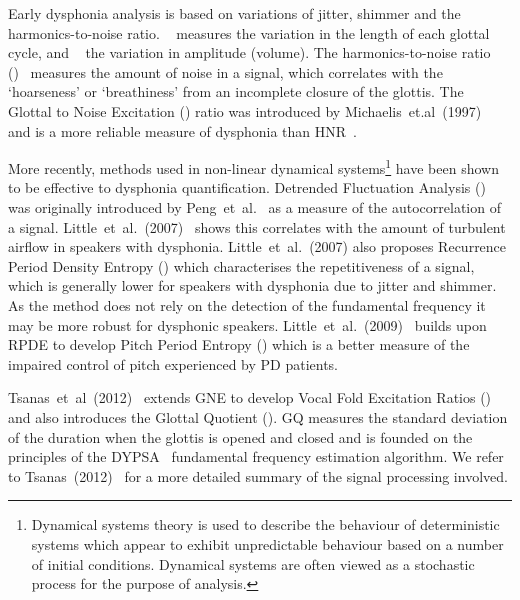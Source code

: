 \documentclass[12pt, twoside]{book}
\renewcommand\emph[1]{\textit{\color{USred}{#1}}}
\begin{document}
Early dysphonia analysis is based on variations of jitter, shimmer and the harmonics-to-noise ratio. \emph{Jitter}~ measures the variation in the length of each glottal cycle, and \emph{shimmer}~\cite{shimmerjitter,jittertime} the variation in amplitude (volume). The harmonics-to-noise ratio (\emph{HNR})~\cite{HNRintro} measures the amount of noise in a signal, which correlates with the `hoarseness' or `breathiness' from an incomplete closure of the glottis.  The Glottal to Noise Excitation (\emph{GNE}) ratio was introduced by Michaelis~et.al~(1997)~\cite{gne} and is a more reliable measure of dysphonia than HNR~\cite{gneratio}. 

\label{dfadescription}
More recently, methods used in non-linear dynamical systems\footnote{Dynamical systems theory is used to describe the behaviour of deterministic systems which appear to exhibit unpredictable behaviour based on a number of initial conditions. Dynamical systems are often viewed as a stochastic process for the purpose of analysis.} have been shown to be effective to dysphonia quantification. Detrended Fluctuation Analysis (\emph{DFA}) was originally introduced by Peng~et~al.~\cite{dfa} as a measure of the autocorrelation of a signal. Little~et~al.~(2007)~\cite{splittlenonlinear2007} shows this correlates with the amount of turbulent airflow in speakers with dysphonia. Little~et~al.~(2007) also proposes Recurrence Period Density Entropy (\emph{RPDE}) which characterises the repetitiveness of a signal, which is generally lower for speakers with dysphonia due to jitter and shimmer. As the method does not rely on the detection of the fundamental frequency it may be more robust for dysphonic speakers. Little~et~al.~(2009)~\cite{splittledysphonia2009} builds upon RPDE to develop Pitch Period Entropy (\emph{PPE}) which is a better measure of the impaired control of pitch experienced by PD patients.

Tsanas~et~al~(2012)~\cite{tsanas2012novel} extends GNE to develop Vocal Fold Excitation Ratios (\emph{VFER}) and also introduces the Glottal Quotient (\emph{GQ}). GQ measures the standard deviation of the duration when the glottis is opened and closed and is founded on the principles of the DYPSA~\cite{dypsa} fundamental frequency estimation algorithm. We refer to Tsanas~(2012)~\cite{spoverview} for a more detailed summary of the signal processing involved.
\end{document}
